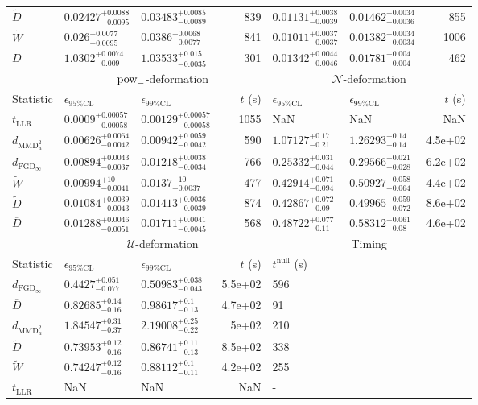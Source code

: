 \begin{tabular}{l|llr|llr}
	$\widetilde{D}$ & $0.02427_{-0.0095}^{+0.0088}$ & $0.03483_{-0.0089}^{+0.0085}$ & 839 & $0.01131_{-0.0039}^{+0.0038}$ & $0.01462_{-0.0036}^{+0.0034}$ & 855 \\
	$\widetilde{W}$ & $0.026_{-0.0095}^{+0.0077}$ & $0.0386_{-0.0077}^{+0.0068}$ & 841 & $0.01011_{-0.0037}^{+0.0037}$ & $0.01382_{-0.0034}^{+0.0034}$ & 1006 \\
	$\overline{D}$ & $1.0302_{-0.009}^{+0.0074}$ & $1.03533_{-0.0035}^{+0.015}$ & 301 & $0.01342_{-0.0046}^{+0.0044}$ & $0.01781_{-0.004}^{+0.004}$ & 462 \\
	\toprule
	\multicolumn{1}{c}{} & \multicolumn{3}{c}{$\rm{pow}_{-}$-deformation} & \multicolumn{3}{c}{$\mathcal{N}$-deformation} \\
	Statistic & $\epsilon_{95\%\mathrm{CL}}$ & $\epsilon_{99\%\mathrm{CL}}$ & $t$ (s) & $\epsilon_{95\%\mathrm{CL}}$ & $\epsilon_{99\%\mathrm{CL}}$ & $t$ (s) \\
	\midrule
	$t_{\mathrm{LLR}}$ & $0.0009_{-0.00058}^{+0.00057}$ & $0.00129_{-0.00058}^{+0.00057}$ & 1055 & NaN & NaN & NaN \\
	$d_{\mathrm{MMD}^{2}_{u}}$ & $0.00626_{-0.0042}^{+0.0064}$ & $0.00942_{-0.0042}^{+0.0059}$ & 590 & $1.07127_{-0.21}^{+0.17}$ & $1.26293_{-0.14}^{+0.14}$ & 4.5e+02 \\
	$d_{\mathrm{FGD}_{\infty}}$ & $0.00894_{-0.0037}^{+0.0043}$ & $0.01218_{-0.0034}^{+0.0038}$ & 766 & $0.25332_{-0.044}^{+0.031}$ & $0.29566_{-0.028}^{+0.021}$ & 6.2e+02 \\
	$\widetilde{W}$ & $0.00994_{-0.0041}^{+10}$ & $0.0137_{-0.0037}^{+10}$ & 477 & $0.42914_{-0.094}^{+0.071}$ & $0.50927_{-0.064}^{+0.058}$ & 4.4e+02 \\
	$\widetilde{D}$ & $0.01084_{-0.0043}^{+0.0039}$ & $0.01413_{-0.0039}^{+0.0036}$ & 874 & $0.42867_{-0.09}^{+0.072}$ & $0.49965_{-0.072}^{+0.059}$ & 8.6e+02 \\
	$\overline{D}$ & $0.01288_{-0.0051}^{+0.0046}$ & $0.01711_{-0.0045}^{+0.0041}$ & 568 & $0.48722_{-0.11}^{+0.077}$ & $0.58312_{-0.08}^{+0.061}$ & 4.6e+02 \\
	\toprule
	\multicolumn{1}{c}{} & \multicolumn{3}{c}{$\mathcal{U}$-deformation} & \multicolumn{3}{c}{Timing} \\
	Statistic & $\epsilon_{95\%\mathrm{CL}}$ & $\epsilon_{99\%\mathrm{CL}}$ & $t$ (s) & $t^{\mathrm{null}}$ (s) \\
	\midrule
	$d_{\mathrm{FGD}_{\infty}}$ & $0.4427_{-0.077}^{+0.051}$ & $0.50983_{-0.043}^{+0.038}$ & 5.5e+02 & 596 \\
	$\overline{D}$ & $0.82685_{-0.16}^{+0.14}$ & $0.98617_{-0.13}^{+0.1}$ & 4.7e+02 & 91 \\
	$d_{\mathrm{MMD}^{2}_{u}}$ & $1.84547_{-0.37}^{+0.31}$ & $2.19008_{-0.22}^{+0.25}$ & 5e+02 & 210 \\
	$\widetilde{D}$ & $0.73953_{-0.16}^{+0.12}$ & $0.86741_{-0.13}^{+0.11}$ & 8.5e+02 & 338 \\
	$\widetilde{W}$ & $0.74247_{-0.16}^{+0.12}$ & $0.88112_{-0.11}^{+0.1}$ & 4.2e+02 & 255 \\
	$t_{\mathrm{LLR}}$ & NaN & NaN & NaN & - \\
	\bottomrule
\end{tabular}